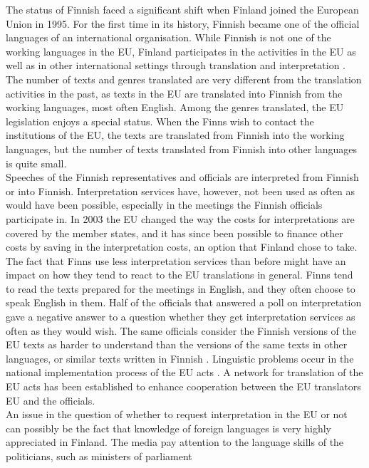 \begin{multicols}{2}
The status of Finnish faced a significant shift when Finland joined
the European Union in 1995. For the first time in its history, Finnish
became one of the official languages of an international
organisation. While Finnish is not one of the working languages in the
EU, Finland participates in the activities in the EU as well as in
other international settings through translation and
interpretation \cite{Tulevaisuus2009}. The number of texts and genres
translated are very different from the translation activities in the
past, as texts in the EU are translated into Finnish from the working
languages, most often English.  Among the genres translated, the EU
legislation enjoys a special status. When the Finns wish to contact
the institutions of the EU, the texts are translated from Finnish into
the working languages, but the number of texts translated from Finnish
into other languages is quite small.\\
Speeches of the Finnish representatives and officials are interpreted
from Finnish or into Finnish. Interpretation services have, however,
not been used as often as would have been possible, especially in the
meetings the Finnish officials participate in. In 2003 the EU changed
the way the costs for interpretations are covered by the member
states, and it has since been possible to finance other costs by
saving in the interpretation costs, an option that Finland chose to
take.\\
The fact that Finns use less interpretation services than before might
have an impact on how they tend to react to the EU translations in
general. Finns tend to read the texts prepared for the meetings in
English, and they often choose to speak English in them. Half of the
officials that answered a poll on interpretation gave a negative
answer to a question whether they get interpretation services as often
as they would wish. The same officials consider the Finnish versions
of the EU texts as harder to understand than the versions of the same
texts in other languages, or similar texts written in Finnish
\cite{Piehl2008}. Linguistic problems occur in the national
implementation process of the EU acts \cite{OECD2010}. A network
for translation of the EU acts has been established to enhance
cooperation between the EU translators EU and the officials.\\
An issue in the question of whether to request interpretation in the
EU or not can possibly be the fact that knowledge of foreign languages
is very highly appreciated in Finland. The media pay attention to the
language skills of the politicians, such as ministers of parliament

\end{multicols}
